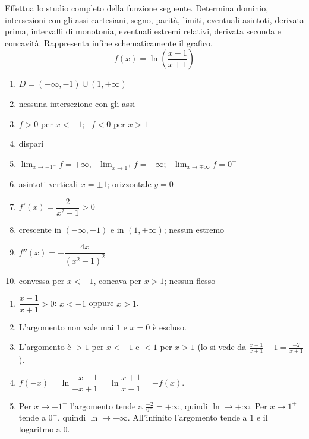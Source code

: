 \begin{question}[ID=2.5, subtitle={Studio completo di una funzione logaritmica composta}, difficulty=difficile, tags={funzioni, studio di funzione, logaritmi}]
Effettua lo studio completo della funzione seguente. Determina dominio, intersezioni con gli assi cartesiani, segno, parità, limiti, eventuali asintoti, derivata prima, intervalli di monotonia, eventuali estremi relativi, derivata seconda e concavità. Rappresenta infine schematicamente il grafico.
\begin{equation*}
    f(x)=\ln\left(\dfrac{x-1}{x+1}\right)
\end{equation*}
\begin{solution}
\begin{enumerate}
    \item $D=(-\infty,-1)\cup(1,+\infty)$
    \item nessuna intersezione con gli assi
    \item $f>0$ per $x<-1$; \ $f<0$ per $x>1$
    \item dispari
    \item $\lim_{x\to-1^-}f=+\infty$, \ $\lim_{x\to1^+}f=-\infty$; \ $\lim_{x\to\mp\infty}f=0^\pm$
    \item asintoti verticali $x=\pm1$; orizzontale $y=0$
    \item $f'(x)=\dfrac{2}{x^2-1}>0$
    \item crescente in $(-\infty,-1)$ e in $(1,+\infty)$; nessun estremo
    \item $f''(x)=-\dfrac{4x}{(x^2-1)^2}$
    \item convessa per $x<-1$, concava per $x>1$; nessun flesso
\end{enumerate}
\end{solution}
\begin{explanation}
\begin{enumerate}
    \item $\dfrac{x-1}{x+1}>0$: $x<-1$ oppure $x>1$.
    \item L'argomento non vale mai $1$ e $x=0$ è escluso.
    \item L'argomento è $>1$ per $x<-1$ e $<1$ per $x>1$ (lo si vede da $\tfrac{x-1}{x+1}-1=\tfrac{-2}{x+1}$).
    \item $f(-x)=\ln\dfrac{-x-1}{-x+1}=\ln\dfrac{x+1}{x-1}=-f(x)$.
    \item Per $x\to-1^-$ l'argomento tende a $\tfrac{-2}{0^-}=+\infty$, quindi $\ln\to+\infty$. Per $x\to1^+$ tende a $0^+$, quindi $\ln\to-\infty$. All'infinito l'argomento tende a $1$ e il logaritmo a $0$.

\end{enumerate}
\end{explanation}
\end{question}
